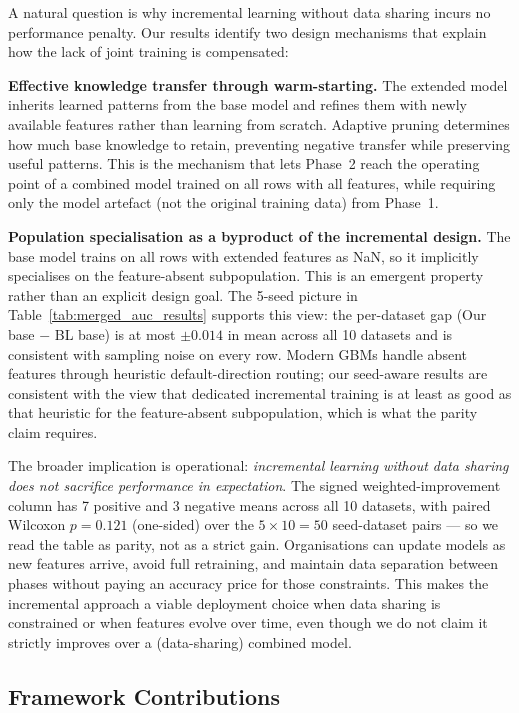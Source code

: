 \documentclass[sigconf]{acmart}
\begin{document}
\begin{itemize}
A natural question is why incremental learning without data sharing incurs no performance penalty. Our results identify two design mechanisms that explain how the lack of joint training is compensated:

\textbf{Effective knowledge transfer through warm-starting.} The extended model inherits learned patterns from the base model and refines them with newly available features rather than learning from scratch. Adaptive pruning determines how much base knowledge to retain, preventing negative transfer while preserving useful patterns. This is the mechanism that lets Phase~2 reach the operating point of a combined model trained on all rows with all features, while requiring only the model artefact (not the original training data) from Phase~1.

\textbf{Population specialisation as a byproduct of the incremental design.} The base model trains on all rows with extended features as NaN, so it implicitly specialises on the feature-absent subpopulation. This is an emergent property rather than an explicit design goal. The 5-seed picture in Table~\ref{tab:merged_auc_results} supports this view: the per-dataset gap (Our base $-$ BL base) is at most $\pm 0.014$ in mean across all 10 datasets and is consistent with sampling noise on every row. Modern GBMs handle absent features through heuristic default-direction routing; our seed-aware results are consistent with the view that dedicated incremental training is at least as good as that heuristic for the feature-absent subpopulation, which is what the parity claim requires.

The broader implication is operational: \textit{incremental learning without data sharing does not sacrifice performance in expectation}. The signed weighted-improvement column has 7 positive and 3 negative means across all 10 datasets, with paired Wilcoxon $p = 0.121$ (one-sided) over the $5\times 10 = 50$ seed-dataset pairs --- so we read the table as parity, not as a strict gain. Organisations can update models as new features arrive, avoid full retraining, and maintain data separation between phases without paying an accuracy price for those constraints. This makes the incremental approach a viable deployment choice when data sharing is constrained or when features evolve over time, even though we do not claim it strictly improves over a (data-sharing) combined model.

\subsection{Framework Contributions}


\end{itemize}
\end{document}
